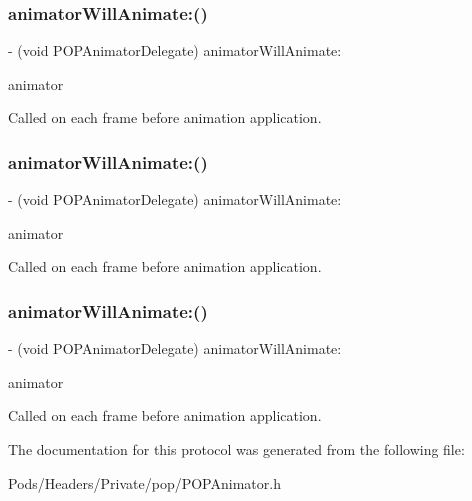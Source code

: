 \subsubsection{\texorpdfstring{animator\+Will\+Animate\+:()}{animatorWillAnimate:()}\hspace{0.1cm}{\footnotesize\ttfamily [1/3]}}
{\footnotesize\ttfamily -\/ (void P\+O\+P\+Animator\+Delegate) animator\+Will\+Animate\+: \begin{DoxyParamCaption}\item[{(\mbox{\hyperlink{interface_p_o_p_animator}{P\+O\+P\+Animator}} $\ast$)}]{animator }\end{DoxyParamCaption}}

Called on each frame before animation application. \mbox{\label{protocol_p_o_p_animator_delegate_01-p_ad5c5b2347027a3edc24a6b1e061c4d13}} 
\subsubsection{\texorpdfstring{animator\+Will\+Animate\+:()}{animatorWillAnimate:()}\hspace{0.1cm}{\footnotesize\ttfamily [2/3]}}
{\footnotesize\ttfamily -\/ (void P\+O\+P\+Animator\+Delegate) animator\+Will\+Animate\+: \begin{DoxyParamCaption}\item[{(\mbox{\hyperlink{interface_p_o_p_animator}{P\+O\+P\+Animator}} $\ast$)}]{animator }\end{DoxyParamCaption}}

Called on each frame before animation application. \mbox{\label{protocol_p_o_p_animator_delegate_01-p_ad5c5b2347027a3edc24a6b1e061c4d13}} 
\subsubsection{\texorpdfstring{animator\+Will\+Animate\+:()}{animatorWillAnimate:()}\hspace{0.1cm}{\footnotesize\ttfamily [3/3]}}
{\footnotesize\ttfamily -\/ (void P\+O\+P\+Animator\+Delegate) animator\+Will\+Animate\+: \begin{DoxyParamCaption}\item[{(\mbox{\hyperlink{interface_p_o_p_animator}{P\+O\+P\+Animator}} $\ast$)}]{animator }\end{DoxyParamCaption}}

Called on each frame before animation application. 

The documentation for this protocol was generated from the following file\+:\begin{DoxyCompactItemize}
\item 
Pods/\+Headers/\+Private/pop/P\+O\+P\+Animator.\+h\end{DoxyCompactItemize}
